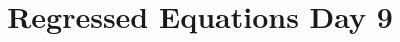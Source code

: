\documentclass[journal]{IEEEtran}
\begin{document}
\title{Regressed Equations Day 9}



\newcommand{\EQN}[0]{Eq. }
\newcommand{\FIG}[0]{Fig. }
\newcommand{\SEC}[0]{Sec. }
\newcommand{\TAB}[0]{Table }
\newcommand{\APX}[0]{Appendix }
\newcommand{\note}[1]{{\bf[#1]}}
\newcommand{\specialcell}[2][c]{%
  \begin{tabular}[#1]{@{}c@{}}#2\end{tabular}}
\newcommand{\tablefont}[1]{\fontsize{#1}{#1}\selectfont}
\newcommand{\UL}[0]{$\rm \mu L$}
\newcommand{\UM}[0]{$\rm \mu m$}




\maketitle







\end{document}
